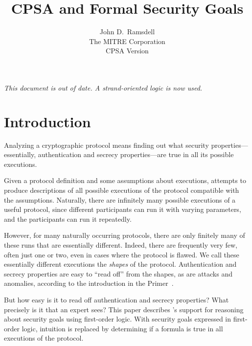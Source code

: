 \documentclass[12pt]{article}
\title{CPSA and Formal Security Goals}
\author{John D.~Ramsdell\\
  The MITRE Corporation\\ CPSA Version \version}
\begin{document}
\maketitle
\cpsacopying

\emph{This document is out of date.  A strand-oriented logic is now used.}

\tableofcontents

\newpage

\listoffigures

\listoftables

\newpage

\section{Introduction}

\begin{sloppypar}
Analyzing a cryptographic protocol means finding out what security
properties---essentially, authentication and secrecy properties---are
true in all its possible executions.
\end{sloppypar}

Given a protocol definition and some assumptions about executions,
{\cpsa} attempts to produce descriptions of all possible executions of
the protocol compatible with the assumptions.  Naturally, there are
infinitely many possible executions of a useful protocol, since
different participants can run it with varying parameters, and the
participants can run it repeatedly.

However, for many naturally occurring protocols, there are only
finitely many of these runs that are essentially different.  Indeed,
there are frequently very few, often just one or two, even in cases
where the protocol is flawed.  We call these essentially different
executions the \emph{shapes} of the protocol.  Authentication and
secrecy properties are easy to ``read off'' from the shapes, as are
attacks and anomalies, according to the introduction in the {\cpsa}
Primer~\cite{cpsaprimer09}.

But how easy is it to read off authentication and secrecy properties?
What precisely is it that an expert sees?  This paper describes
{\cpsa}'s support for reasoning about security goals using first-order
logic.  With security goals expressed in first-order logic, intuition
is replaced by determining if a formula is true in all executions of
the protocol.

\end{document}
